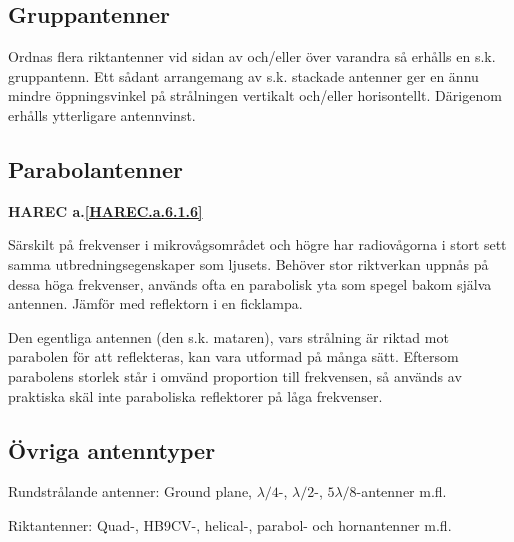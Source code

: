 

\subsection{Gruppantenner}

Ordnas flera riktantenner vid sidan av och/eller över varandra så
erhålls en s.k. gruppantenn. Ett sådant arrangemang av s.k. stackade
antenner ger en ännu mindre öppningsvinkel på strålningen vertikalt
och/eller horisontellt. Därigenom erhålls ytterligare antennvinst.

\subsection{Parabolantenner}
\textbf{
HAREC a.\ref{HAREC.a.6.1.6}\label{myHAREC.a.6.1.6}
}

Särskilt på frekvenser i mikrovågsområdet och högre har radiovågorna i
stort sett samma utbredningsegenskaper som ljusets.  Behöver stor
riktverkan uppnås på dessa höga frekvenser, används ofta en parabolisk
yta som spegel bakom själva antennen.  Jämför med reflektorn i en
ficklampa.

Den egentliga antennen (den s.k. mataren), vars strålning är riktad
mot parabolen för att reflekteras, kan vara utformad på många
sätt. Eftersom parabolens storlek står i omvänd proportion till
frekvensen, så används av praktiska skäl inte paraboliska reflektorer
på låga frekvenser.

\subsection{Övriga antenntyper}

Rundstrålande antenner: Ground plane, \(\lambda/4\)-, \(\lambda/2\)-,
\(5\lambda/8\)-antenner m.fl.

Riktantenner: Quad-, HB9CV-, helical-, parabol- och hornantenner m.fl.
